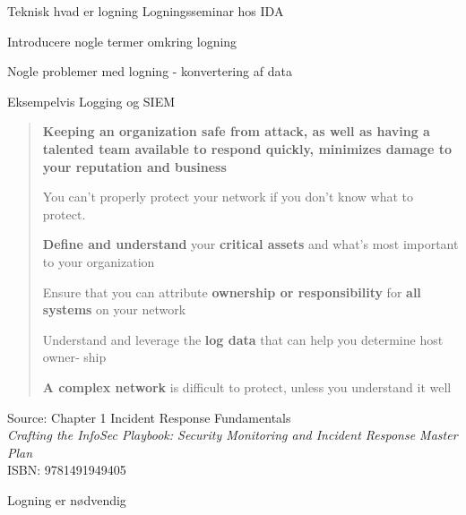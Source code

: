 \documentclass[Screen16to9,17pt]{foils}
\begin{document}
\mytitlepage
{Teknisk hvad er logning}
{Logningsseminar hos IDA}

\hlkprofil




\begin{list2}
\item Introducere nogle termer omkring logning
\item Nogle problemer med logning - konvertering af data
\item Eksempelvis Logging og SIEM
\end{list2}







\begin{quote}
\begin{list2}
\item {\bf Keeping an organization safe from attack, as well as having a talented team available to respond quickly, minimizes damage to your reputation and business}
\item You can’t properly protect your network if you don’t know what to protect.
\item {\bf Define and understand} your {\bf critical assets} and what’s most important to your
  organization
\item Ensure that you can attribute {\bf ownership or responsibility} for {\bf all systems} on your
  network
\item Understand and leverage the {\bf log data} that can help you determine host owner‐
  ship
\item {\bf A complex network} is difficult to protect, unless you understand it well
\end{list2}
\end{quote}
Source: Chapter 1 Incident Response Fundamentals\\
\emph{Crafting the InfoSec Playbook: Security Monitoring and Incident Response Master Plan}\\ ISBN: 9781491949405

\vskip 5mm
\centerline{\Large Logning er nødvendig}




\end{document}

